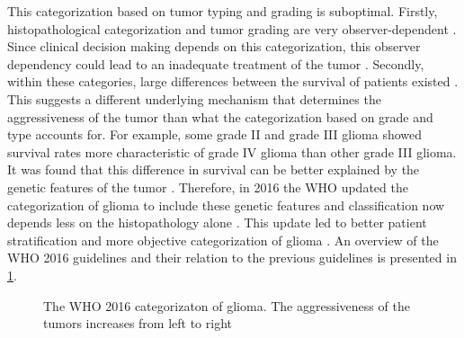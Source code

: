 This categorization based on \gls{tumor} typing and grading is suboptimal.
Firstly, histopathological categorization and \gls{tumor} grading are very observer-dependent \autocite{mittler1996gradingreliability, vandenbent2010interobserver}.
Since clinical decision making depends on this categorization, this observer dependency could lead to an inadequate treatment of the \gls{tumor} \autocite{vandenbent2010interobserver}.
Secondly, within these categories, large differences between the survival of patients existed  \autocite{dubbink2015molecular}.
This suggests a different underlying mechanism that determines the aggressiveness of the \gls{tumor} than what the categorization based on grade and type accounts for.
For example, some grade II and grade III \gls{glioma} showed survival rates more characteristic of grade IV \gls{glioma} than other grade III \gls{glioma}.
It was found that this difference in survival can be better explained by the genetic features of the \gls{tumor} \autocite{dubbink2015molecular,eckel2015gliomagroups}.
Therefore, in 2016 the \gls{WHO} updated the categorization of \gls{glioma} to include these genetic features and classification now depends less on the histopathology alone \autocite{louis20162016}.
This update led to better patient stratification and more objective categorization of \gls{glioma} \autocite{molinaro2019geneticepidemiology}.
An overview of the \gls{WHO} 2016 guidelines and their relation to the previous guidelines is presented in \cref{fig:intro_glioma_categorization}.

\begin{figure}[hbt]
    \centering
    \caption{The \acrfull{WHO} 2016 categorizaton of glioma. The aggressiveness of the \glspl{tumor} increases from left to right}\label{fig:intro_glioma_categorization}
\end{figure}

